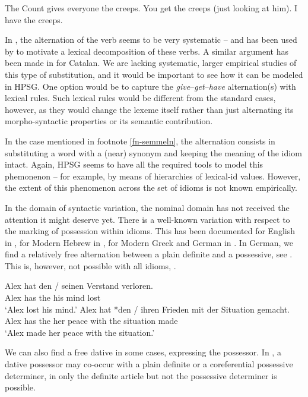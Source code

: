 \documentclass[output=paper]{langsci/langscibook}
\begin{document}
\eal  \label{creeps}
\ex The Count gives everyone the creeps.
\ex You get the creeps (just looking at him).
\ex I have the creeps.
\zl 

In , the alternation of the verb seems to be very systematic -- and has been used by \cite{Richards:01} to motivate a lexical decomposition of these verbs.
A similar argument has been made in \cite{Mateu:Espinal:07} for Catalan. 
We are lacking systematic, larger empirical studies of this type of substitution, and it would be important to see how it can be modeled in HPSG. 
One option would be to capture the \emph{give}--\emph{get}--\emph{have} alternation(s) with lexical rules. Such lexical rules would be different from the standard cases, however, as they would change the lexeme itself rather than just alternating its morpho-syntactic properties or its semantic contribution.

In the case mentioned in footnote \ref{fn-semmeln}, the alternation consists in substituting a word with a (near) synonym and keeping the meaning of the idiom intact. Again, HPSG seems to have all the required tools to model this phemonenon -- for example, by means of hierarchies of lexical-id values. 
However, the extent of this phenomenon across the set of idioms is not known empirically. 

In the domain of syntactic variation, the nominal domain has not received the attention it might deserve yet. 
There is a well-known variation with respect to the marking of possession within idioms. 
This has been documented for English in \cite{Ho:15}, for Modern Hebrew in \cite{Almog:12}, for Modern Greek and German in \cite{Markantonatou:Sailer:16}. 
In German, we find a relatively free alternation between a plain definite and a possessive, see . This is, however, not possible with all idioms,  .

\eal \label{ex-verstand-herz}
\ex 
\gll Alex hat den / seinen Verstand verloren.\\
Alex has the {} his mind lost\\
\glt `Alex lost his mind.'\label{ex-verstand}
\ex 
\gll Alex hat *den / ihren Frieden mit der Situation gemacht.\\
     Alex has the {} her peace with the situation made\\
\glt `Alex made her peace with the situation.'\label{ex-frieden}
\zl 


We can also find a free dative in some cases, expressing the possessor. 
In , a dative possessor may co-occur with a plain definite or a coreferential possessive determiner, in  only the definite article but not the possessive determiner is possible.  
\end{document}
